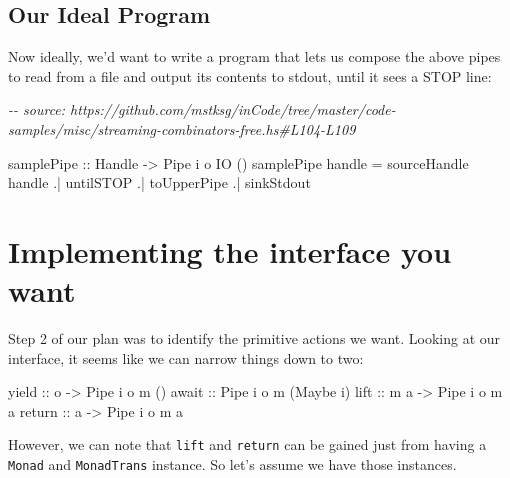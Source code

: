 \documentclass[]{article}
\newenvironment{Shaded}{}{}
\newcommand{\CommentTok}[1]{\textcolor[rgb]{0.38,0.63,0.69}{\textit{#1}}}
\newcommand{\DataTypeTok}[1]{\textcolor[rgb]{0.56,0.13,0.00}{#1}}
\newcommand{\FunctionTok}[1]{\textcolor[rgb]{0.02,0.16,0.49}{#1}}
\newcommand{\NormalTok}[1]{#1}
\newcommand{\OperatorTok}[1]{\textcolor[rgb]{0.40,0.40,0.40}{#1}}
\newcommand{\OtherTok}[1]{\textcolor[rgb]{0.00,0.44,0.13}{#1}}
\begin{document}
\hypertarget{our-ideal-program}{%
\subsection{Our Ideal Program}\label{our-ideal-program}}

Now ideally, we'd want to write a program that lets us compose the above pipes
to read from a file and output its contents to stdout, until it sees a STOP
line:

\begin{Shaded}
\begin{Highlighting}[]
\CommentTok{{-}{-} source: https://github.com/mstksg/inCode/tree/master/code{-}samples/misc/streaming{-}combinators{-}free.hs\#L104{-}L109}

\OtherTok{samplePipe ::} \DataTypeTok{Handle} \OtherTok{{-}>} \DataTypeTok{Pipe}\NormalTok{ i o }\DataTypeTok{IO}\NormalTok{ ()}
\NormalTok{samplePipe handle }\OtherTok{=}
\NormalTok{       sourceHandle handle}
    \OperatorTok{.|}\NormalTok{ untilSTOP}
    \OperatorTok{.|}\NormalTok{ toUpperPipe}
    \OperatorTok{.|}\NormalTok{ sinkStdout}
\end{Highlighting}
\end{Shaded}

\hypertarget{implementing-the-interface-you-want}{%
\section{Implementing the interface you
want}\label{implementing-the-interface-you-want}}

Step 2 of our plan was to identify the primitive actions we want. Looking at our
interface, it seems like we can narrow things down to two:

\begin{Shaded}
\begin{Highlighting}[]
\OtherTok{yield  ::}\NormalTok{ o }\OtherTok{{-}>} \DataTypeTok{Pipe}\NormalTok{ i o m ()}
\OtherTok{await  ::} \DataTypeTok{Pipe}\NormalTok{ i o m (}\DataTypeTok{Maybe}\NormalTok{ i)}
\OtherTok{lift   ::}\NormalTok{ m a }\OtherTok{{-}>} \DataTypeTok{Pipe}\NormalTok{ i o m a}
\FunctionTok{return}\OtherTok{ ::}\NormalTok{ a   }\OtherTok{{-}>} \DataTypeTok{Pipe}\NormalTok{ i o m a}
\end{Highlighting}
\end{Shaded}

However, we can note that \texttt{lift} and \texttt{return} can be gained just
from having a \texttt{Monad} and \texttt{MonadTrans} instance. So let's assume
we have those instances.
\end{document}
